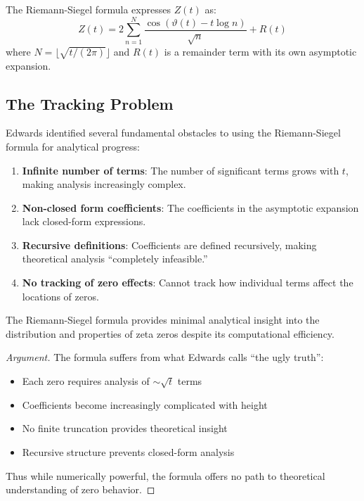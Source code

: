 The Riemann-Siegel formula expresses $Z(t)$ as:
$$Z(t) = 2 \sum_{n=1}^{N} \frac{\cos(\vartheta(t) - t \log n)}{\sqrt{n}} + R(t)$$
where $N = \lfloor \sqrt{t/(2\pi)} \rfloor$ and $R(t)$ is a remainder term with its own asymptotic expansion.

\subsection{The Tracking Problem}

Edwards \cite{edwards1974} identified several fundamental obstacles to using the Riemann-Siegel formula for analytical progress:

\begin{enumerate}
\item \textbf{Infinite number of terms}: The number of significant terms grows with $t$, making analysis increasingly complex.

\item \textbf{Non-closed form coefficients}: The coefficients in the asymptotic expansion lack closed-form expressions.

\item \textbf{Recursive definitions}: Coefficients are defined recursively, making theoretical analysis ``completely infeasible.''

\item \textbf{No tracking of zero effects}: Cannot track how individual terms affect the locations of zeros.
\end{enumerate}

\begin{theorem}
The Riemann-Siegel formula provides minimal analytical insight into the distribution and properties of zeta zeros despite its computational efficiency.
\end{theorem}

\begin{proof}[Argument]
The formula suffers from what Edwards calls \cite{edwards1974} ``the ugly truth'':
\begin{itemize}
\item Each zero requires analysis of $\sim \sqrt{t}$ terms
\item Coefficients become increasingly complicated with height
\item No finite truncation provides theoretical insight
\item Recursive structure prevents closed-form analysis
\end{itemize}

Thus while numerically powerful, the formula offers no path to theoretical understanding of zero behavior.
\end{proof}

